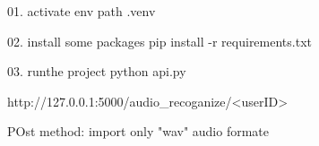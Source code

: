 01. activate env path 
.venv\Scripts\activate

02. install some packages
pip install -r requirements.txt

03. runthe project
python api.py

http://127.0.0.1:5000/audio_recoganize/<userID>

POst method: import only "wav" audio formate 